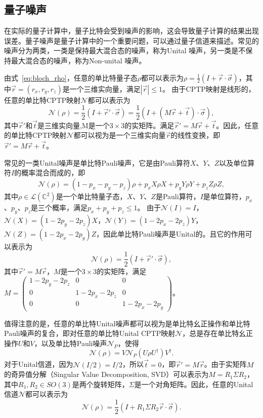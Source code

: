 \subsection{量子噪声}
在实际的量子计算中，量子比特会受到噪声的影响，这会导致量子计算的结果出现误差。量子噪声是量子计算中的一个重要问题，可以通过量子信道来描述。常见的噪声分为两类，一类是保持最大混合态的噪声，称为Unital 噪声，另一类是不保持最大混合态的噪声，称为Non-unital 噪声。

由式~\ref{eq:bloch_rho}，任意的单比特量子态$\rho$都可以表示为$\rho = \frac{1}{2}(I + \vec{r}\cdot\vec{\sigma})$，其中$\vec{r} = (r_x, r_y, r_z)$是一个三维实向量，满足$|\vec{r}| \leq 1$。
由于CPTP映射是线形的，任意的单比特CPTP映射$\mathcal{N}$都可以表示为
\begin{equation}
    \mathcal{N}(\rho) = \frac{1}{2}(I + \vec{r}'\cdot\vec{\sigma})= \frac{1}{2}(I + (M\vec{r}+\vec{t})\cdot\vec{\sigma}),
\end{equation}
其中$\vec{r}'$和$\vec{t}$是三维实向量,M是一个$3\times 3$的实矩阵。满足$\vec{r}'= M\vec{r}+\vec{t}$。因此，任意的单比特CPTP映射$\mathcal{N}$都可以视为是一个三维实向量$\vec{r}$的线性变换，即$\vec{r}' = M\vec{r}+\vec{t}$。

常见的一类Unital噪声是单比特Pauli噪声，它是由Pauli算符$X$、$Y$、$Z$以及单位算符$I$的概率混合而成的，即
\begin{equation}
    \mathcal{N}(\rho) = (1-p_x-p_y-p_z)\rho + p_x X\rho X + p_y Y\rho Y + p_z Z\rho Z,
\end{equation}
其中$\rho\in \mathcal{L}(\mathbb{C}^2)$是一个单比特量子态，$X$、$Y$、$Z$是Pauli算符，$I$是单位算符，$p_x$、$p_y$、$p_z$是三个概率，满足$p_x+p_y+p_z \leq 1$。
由于$\mathcal{N}(I) = I$，$\mathcal{N}(X)=(1-2p_y-2p_z)X$，$\mathcal{N}(Y)=(1-2p_x-2p_z)Y$，$\mathcal{N}(Z)=(1-2p_x-2p_y)Z$，因此单比特Pauli噪声是Unital的。且它的作用可以表示为
\begin{equation}
    \mathcal{N}(\rho) = \frac{1}{2}(I + \vec{r}'\cdot\vec{\sigma}),
\end{equation}
其中$\vec{r}' = M\vec{r}$，$M$是一个$3\times 3$的实矩阵，满足$M = \begin{pmatrix} 1-2p_y-2p_z & 0 & 0 \\ 0 & 1-2p_x-2p_z & 0 \\ 0 & 0 & 1-2p_x-2p_y \end{pmatrix}$。

值得注意的是，任意的单比特Unital噪声都可以视为是单比特幺正操作和单比特Pauli噪声的复合，即对任意的单比特Unital CPTP映射$\mathcal{N}$，总是存在单比特幺正操作$U$和$V$，以及单比特Pauli噪声$\mathcal{N}_P$，使得
\begin{equation}
    \mathcal{N}(\rho) = V\mathcal{N}_P(U\rho U^\dagger)V^\dagger.
\end{equation}
对于Unital信道，因为$\mathcal{N}(I/2) = I/2$，所以$\vec{t} = 0$，即$\vec{r}' = M\vec{r}$。由于实矩阵$M$的奇异值分解（Singular Value Decomposition, SVD）可以表示为$M = R_1\Sigma R_2$，其中$R_1,R_2 \in SO(3)$是两个旋转矩阵，$\Sigma$是一个对角矩阵。因此，任意的Unital信道$\mathcal{N}$都可以表示为
\begin{equation}
    \mathcal{N}(\rho) = \frac{1}{2}(I + R_1\Sigma R_2\vec{r}\cdot\vec{\sigma}).
\end{equation}

